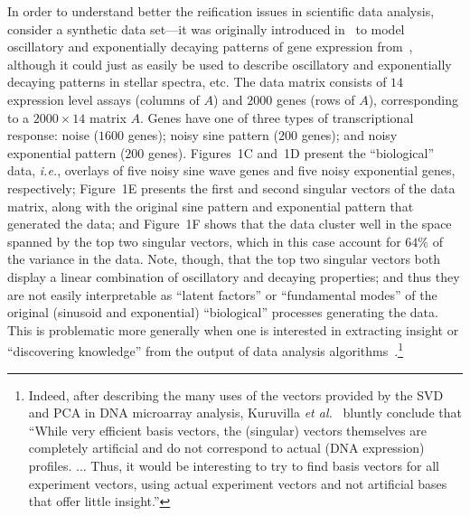 \documentclass[twoside]{article}
\begin{document}
In order to understand better the reification issues in scientific data 
analysis, consider a synthetic data set---it was originally introduced 
in~\cite{WRR03} to model oscillatory and exponentially decaying patterns of 
gene expression from~\cite{Cho_cellcycle_98}, although it could just as 
easily be used to describe oscillatory and exponentially decaying patterns 
in stellar spectra, etc.
The data matrix consists of $14$ expression level assays (columns of $A$) and
$2000$ genes (rows of $A$), corresponding to a $2000 \times 14$ matrix $A$.
Genes have one of three types of transcriptional response:
noise ($1600$ genes); noisy sine pattern ($200$ genes); and noisy exponential 
pattern ($200$ genes).
Figures~1C and~1D present the ``biological'' data, \emph{i.e.}, overlays of 
five noisy sine wave genes and five noisy exponential genes, respectively;
Figure~1E presents the first and second singular vectors of the data matrix, 
along with the original sine pattern and exponential pattern that generated 
the data; and 
Figure~1F shows that the data cluster well in the space spanned by the top 
two singular vectors, which in this case account for $64\%$ of the variance 
in the data. 
Note, though, that the top two singular vectors both display a linear combination of oscillatory and 
decaying properties; and thus they are not easily interpretable as ``latent
factors'' or ``fundamental modes'' of the original (sinusoid and exponential) 
``biological'' processes generating the data.
This is problematic more generally when one is interested in extracting 
insight or ``discovering knowledge'' from the output of data analysis 
algorithms~\cite{CUR_PNAS}.\footnote{Indeed, after describing the many uses of the vectors provided by 
the SVD and PCA in DNA microarray analysis, Kuruvilla 
\emph{et al.}~\cite{KPS02} bluntly conclude that 
``While very efficient basis vectors, the (singular) vectors 
themselves are completely artificial and do not correspond to actual (DNA
expression) profiles. ... Thus, it would be interesting to try to find basis 
vectors for all experiment vectors, using actual experiment vectors and not 
artificial bases that offer little insight.''}
\end{document}
